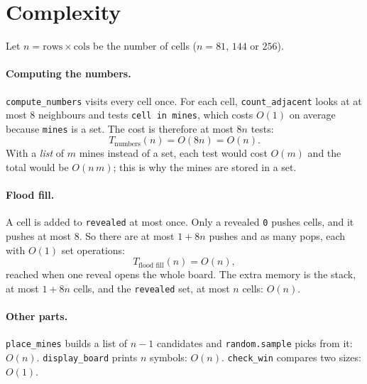 \documentclass[11pt,a4paper]{article}
\newcommand{\code}[1]{\texttt{#1}}
\begin{document}
\section{Complexity}

Let $n = \text{rows}\times\text{cols}$ be the number of cells ($n = 81$, $144$ or $256$).

\paragraph{Computing the numbers.} \code{compute\_numbers} visits every cell once. For each cell,
\code{count\_adjacent} looks at at most 8 neighbours and tests \code{cell in mines}, which costs $O(1)$
on average because \code{mines} is a set. The cost is therefore at most $8n$ tests:
\[ T_{\text{numbers}}(n) = O(8n) = O(n). \]
With a \emph{list} of $m$ mines instead of a set, each test would cost $O(m)$ and the total would be
$O(n\,m)$; this is why the mines are stored in a set.

\paragraph{Flood fill.} A cell is added to \code{revealed} at most once. Only a revealed \code{0} pushes
cells, and it pushes at most 8. So there are at most $1 + 8n$ pushes and as many pops, each with
$O(1)$ set operations:
\[ T_{\text{flood fill}}(n) = O(n), \]
reached when one reveal opens the whole board. The extra memory is the stack, at most $1 + 8n$ cells,
and the \code{revealed} set, at most $n$ cells: $O(n)$.

\paragraph{Other parts.} \code{place\_mines} builds a list of $n-1$ candidates and
\code{random.sample} picks from it: $O(n)$. \code{display\_board} prints $n$ symbols: $O(n)$.
\code{check\_win} compares two sizes: $O(1)$.
\end{document}
